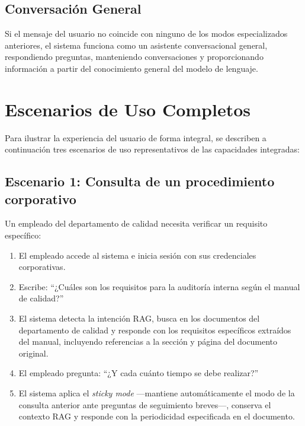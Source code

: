 \subsection{Conversación General}
\label{subsec:modo-chat}

Si el mensaje del usuario no coincide con ninguno de los modos especializados anteriores, el sistema funciona como un asistente conversacional general, respondiendo preguntas, manteniendo conversaciones y proporcionando información a partir del conocimiento general del modelo de lenguaje.

\section{Escenarios de Uso Completos}
\label{sec:escenarios}

Para ilustrar la experiencia del usuario de forma integral, se describen a continuación tres escenarios de uso representativos de las capacidades integradas:

\subsection{Escenario 1: Consulta de un procedimiento corporativo}

Un empleado del departamento de calidad necesita verificar un requisito específico:

\begin{enumerate}
    \item El empleado accede al sistema e inicia sesión con sus credenciales corporativas.
    \item Escribe: ``¿Cuáles son los requisitos para la auditoría interna según el manual de calidad?''
    \item El sistema detecta la intención RAG, busca en los documentos del departamento de calidad y responde con los requisitos específicos extraídos del manual, incluyendo referencias a la sección y página del documento original.
    \item El empleado pregunta: ``¿Y cada cuánto tiempo se debe realizar?''
    \item El sistema aplica el \textit{sticky mode} ---mantiene automáticamente el modo de la consulta anterior ante preguntas de seguimiento breves---, conserva el contexto RAG y responde con la periodicidad especificada en el documento.
\end{enumerate}


